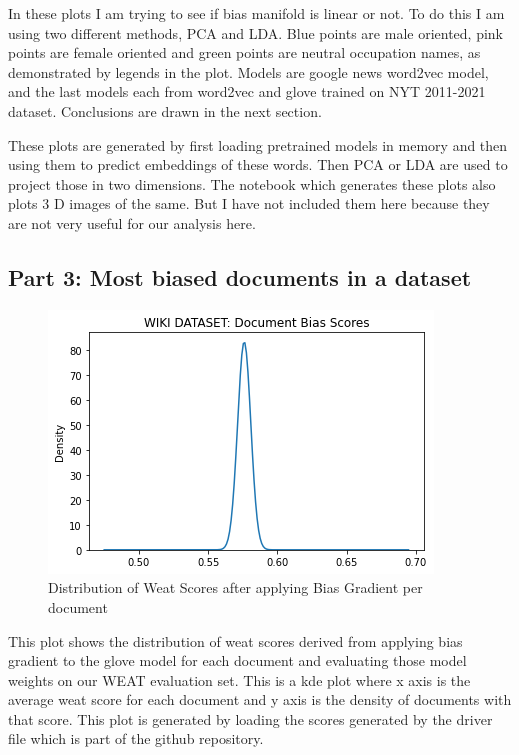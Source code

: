 \documentclass{article}
\begin{document}
In these plots I am trying to see if bias manifold is linear or not. To do this I am using two different methods, PCA and LDA. Blue points are male oriented, pink points are female oriented and green points are neutral occupation names, as demonstrated by legends in the plot. Models are google news word2vec model, and the last models each from word2vec and glove trained on NYT 2011-2021 dataset. Conclusions are drawn in the next section.

These plots are generated by first loading pretrained models in memory and then using them to predict embeddings of these words. Then PCA or LDA are used to project those in two dimensions. The notebook which generates these plots also plots 3 D images of the same. But I have not included them here because they are not very useful for our analysis here.

\subsection{Part 3: Most biased documents in a dataset}

\begin{figure}[H]
    \centering
    \includegraphics[width=\textwidth]{images/document_weat_scores.png}
    \caption{Distribution of Weat Scores after applying Bias Gradient per document}
    \label{fig:document_weat_scores}
\end{figure}

This plot shows the distribution of weat scores derived from applying bias gradient to the glove model for each document and evaluating those model weights on our WEAT evaluation set. This is a kde plot where x axis is the average weat score for each document and y axis is the density of documents with that score. This plot is generated by loading the scores generated by the driver file which is part of the github repository.
\end{document}
